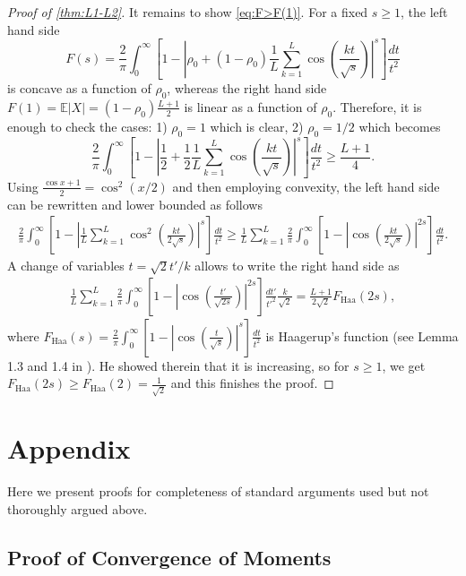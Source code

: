 \documentclass[10pt]{article}
\newcommand{\E}{\mathbb{E}}
\newcommand{\1}{\textbf{1}}
\theoremstyle{remark}
\theoremstyle{definition}
\begin{document}
\begin{proof}[Proof of \ref{thm:L1-L2}]
It remains to show \eqref{eq:F>F(1)}. For a fixed $s \geq 1$, the left hand side
\[
F(s) = \frac{2}{\pi}\int_0^\infty\left[1 - \left|\rho_0 + (1-\rho_0)\frac{1}{L}\sum_{k=1}^L \cos\left(\frac{kt}{\sqrt{s}}\right)\right|^s\right]\frac{dt}{t^2}
\]
is concave as a function of $\rho_0$, whereas the right hand side $F(1) = \E|X| = (1-\rho_0)\frac{L+1}{2}$ is linear as a function of $\rho_0$. Therefore, it is enough to check the cases: 1) $\rho_0 = 1$ which is clear, 2) $\rho_0 = 1/2$ which becomes
\[
\frac{2}{\pi}\int_0^\infty\left[1 - \left|\frac{1}{2} + \frac{1}{2}\frac{1}{L}\sum_{k=1}^L \cos\left(\frac{kt}{\sqrt{s}}\right)\right|^s\right]\frac{dt}{t^2} \geq \frac{L+1}{4}.
\]
Using $\frac{\cos x +1}{2} = \cos^2(x/2)$ and then employing convexity, the left hand side can be rewritten and lower bounded as follows
\begin{align*}
\frac{2}{\pi}\int_0^\infty\left[1 - \left|\frac{1}{L}\sum_{k=1}^L \cos^2\left(\frac{kt}{2\sqrt{s}}\right)\right|^s\right]\frac{dt}{t^2} \geq \frac{1}{L}\sum_{k=1}^L\frac{2}{\pi}\int_0^\infty\left[1 - \left|\cos\left(\frac{kt}{2\sqrt{s}}\right)\right|^{2s}\right]\frac{dt}{t^2}.
\end{align*}
A change of variables $t = \sqrt{2}t'/k$ allows to write the right hand side as
\begin{align*}
\frac{1}{L}\sum_{k=1}^L\frac{2}{\pi}\int_0^\infty\left[1 - \left|\cos\left(\frac{t'}{\sqrt{2s}}\right)\right|^{2s}\right]\frac{dt'}{t'^2}\frac{k}{\sqrt{2}} = \frac{L+1}{2\sqrt{2}}F_{\text{Haa}}(2s),
\end{align*}
where $F_{\text{Haa}}(s) = \frac{2}{\pi}\int_0^\infty\left[1 - \left|\cos\left(\frac{t}{\sqrt{s}}\right)\right|^{s}\right]\frac{dt}{t^2}$ is Haagerup's function (see Lemma 1.3 and 1.4 in \cite{H}). He showed therein that it is increasing, so for $s \geq 1$, we get $F_{\text{Haa}}(2s) \geq F_{\text{Haa}}(2) = \frac{1}{\sqrt{2}}$ and this finishes the proof.
\end{proof}


\section{Appendix}

Here we present proofs for completeness of standard arguments used but not thoroughly argued above.

\subsection{Proof of Convergence of Moments}
\end{document}
